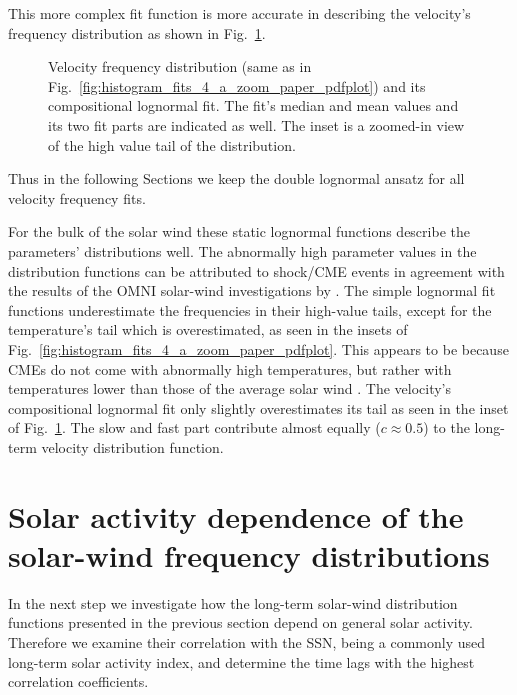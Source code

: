 \documentclass[]{aa}
\begin{document}
        This more complex fit function is more accurate in describing the velocity's frequency distribution as shown in Fig.~\ref{fig:histogram_fits_V_a_zoom_dbl_paper_pdfplot}.
        \begin{figure}
                \caption{Velocity frequency distribution (same as in Fig.~\ref{fig:histogram_fits_4_a_zoom_paper_pdfplot}) and its compositional lognormal fit. The fit's median and mean values and its two fit parts are indicated as well. The inset is a zoomed-in view of the high value tail of the distribution.}
                \label{fig:histogram_fits_V_a_zoom_dbl_paper_pdfplot}
        \end{figure}
        Thus in the following Sections we keep the double lognormal ansatz for all velocity frequency fits.

        For the bulk of the solar wind these static lognormal functions describe the parameters' distributions well. The abnormally high parameter values in the distribution functions can be attributed to shock/CME events in agreement with the results of the OMNI solar-wind investigations by \citet{Richardson2012}. The simple lognormal fit functions underestimate the frequencies in their high-value tails, except for the temperature’s tail which is overestimated, as seen in the insets of Fig.~\ref{fig:histogram_fits_4_a_zoom_paper_pdfplot}. This appears to be because CMEs do not come with abnormally high temperatures, but rather with temperatures lower than those of the average solar wind \citep{Forsyth2006}. The velocity's compositional lognormal fit only slightly overestimates its tail as seen in the inset of Fig.~\ref{fig:histogram_fits_V_a_zoom_dbl_paper_pdfplot}.
        The slow and fast part contribute almost equally ($c \approx 0.5$) to the long-term velocity distribution function.

        \section{Solar activity dependence of the solar-wind frequency distributions}
        \label{sec:solar_activity_variations}
        In the next step we investigate how the long-term solar-wind distribution functions presented in the previous section depend on general solar activity. Therefore we examine their correlation with the SSN, being a commonly used long-term solar activity index, and determine the time lags with the highest correlation coefficients.
\end{document}
